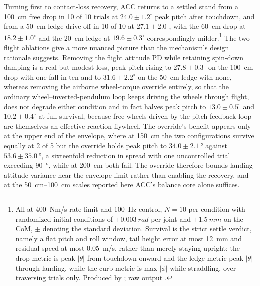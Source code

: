\documentclass[a4paper,fleqn]{cas-dc}
\begin{document}
Turning first to contact-loss recovery, ACC returns to a settled stand from a
\SI{100}{cm} free drop in \num{10} of \num{10} trials at $24.0{\pm}1.2^\circ$
peak pitch after touchdown, and from a \SI{50}{cm} ledge drive-off in \num{10} of
\num{10} at $27.1{\pm}2.0^\circ$, with the \SI{60}{cm} drop at
$18.2{\pm}1.0^\circ$ and the \SI{20}{cm} ledge at $19.6{\pm}0.3^\circ$
correspondingly milder.\footnote{All at \SI{400}{Nm/s} rate limit and
\SI{100}{Hz} control, $N{=}10$ per condition with randomized initial conditions
of $\pm\SI{0.003}{rad}$ per joint and $\pm\SI{1.5}{mm}$ on the CoM, $\pm$
denoting the standard deviation. Survival is the strict settle verdict, namely a
flat pitch and roll window, tail height error at most \SI{12}{mm} and residual
speed at most \SI{0.05}{m/s}, rather than merely staying upright; the drop metric
is peak $|\theta|$ from touchdown onward and the ledge metric peak $|\theta|$
through landing, while the curb metric is max $|\phi|$ while straddling, over
traversing trials only. Produced by
; raw output
.} The two flight
ablations give a more nuanced picture than the mechanism's design rationale
suggests. Removing the flight attitude PD while retaining spin-down damping is a
real but modest loss, peak pitch rising to $27.8{\pm}0.3^\circ$ on the
\SI{100}{cm} drop with one fall in ten and to $31.6{\pm}2.2^\circ$ on the
\SI{50}{cm} ledge with none, whereas removing the airborne wheel-torque
override
entirely, so that the ordinary wheel--inverted-pendulum loop keeps driving the
wheels through flight, does not degrade either condition and in fact halves peak pitch to
$13.0{\pm}0.5^\circ$ and $10.2{\pm}0.4^\circ$ at full survival, because free
wheels driven by the pitch-feedback loop are themselves an effective reaction
flywheel. The override's benefit appears only at
the upper end of the envelope, where at \SI{150}{cm} the two configurations
survive equally at \num{2} of \num{5} but the override holds peak pitch to
$34.0{\pm}\SI{2.1}{\degree}$ against $53.6{\pm}\SI{35.0}{\degree}$, a sixteenfold
reduction in spread with one uncontrolled trial exceeding \SI{90}{\degree}, while
at \SI{200}{cm} both fail. The override therefore bounds landing-attitude
variance near the envelope limit rather than enabling the recovery, and at the
\SIrange{50}{100}{cm} scales reported here ACC's balance core alone suffices.
\end{document}
